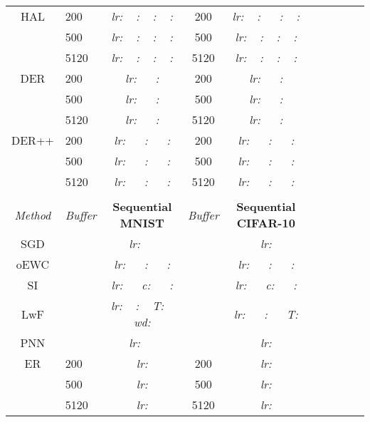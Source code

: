 \documentclass{article}
\newcommand{\xmark}{\textbf{\textendash}}
\begin{document}
\begin{table}[H]
\begin{tabular}{| Sl | Sc | Sl | Sc | Sl |}
HAL     & 200    & \textit{lr:}   ~ \textit{:}  ~ \textit{:}  ~ \textit{:}   & 200  & \textit{lr:}   ~ \textit{:} ~~ \textit{:}  ~ \textit{:}   \\
        & 500    & \textit{lr:}   ~ \textit{:}  ~ \textit{:}  ~ \textit{:}    & 500  & \textit{lr:}   ~ \textit{:}  ~ \textit{:}  ~ \textit{:}   \\
        & 5120   & \textit{lr:}   ~ \textit{:}  ~ \textit{:}  ~ \textit{:}    & 5120 & \textit{lr:}   ~ \textit{:}  ~ \textit{:}  ~ \textit{:}   \\
DER     & 200    & \textit{lr:}   ~~ \textit{:}  & 200  & \textit{lr:}   ~~ \textit{:}  \\
        & 500    & \textit{lr:}   ~~ \textit{:}  & 500  & \textit{lr:}   ~~ \textit{:}  \\
        & 5120   & \textit{lr:}   ~~ \textit{:}  & 5120 & \textit{lr:}   ~~ \textit{:}  \\
DER++   & 200    & \textit{lr:}   ~~ \textit{:}  ~~ \textit{:}  & 200  & \textit{lr:}   ~~ \textit{:}  ~~ \textit{:}  \\
        & 500    & \textit{lr:}   ~~ \textit{:}  ~~ \textit{:}  & 500  & \textit{lr:}   ~~ \textit{:}  ~~ \textit{:}  \\
        & 5120   & \textit{lr:}   ~~ \textit{:}  ~~ \textit{:}  & 5120 & \textit{lr:}   ~~ \textit{:}  ~~ \textit{:}  \\
        & & & & \\
\hline
\textit{Method} & \textit{Buffer} & \textbf{Sequential MNIST} & \textit{Buffer} & \textbf{Sequential CIFAR-10}  \\
\hline
SGD & \xmark & \textit{lr:}   ~~ & \xmark & \textit{lr:}  \\
oEWC    & \xmark & \textit{lr:}  ~~ \textit{:}  ~~ \textit{:}  & \xmark & \textit{lr:}  ~~ \textit{:}  ~~ \textit{:}  \\
SI      & \xmark & \textit{lr:}  ~~ \textit{c:}  ~~ \textit{:}  & \xmark & \textit{lr:}  ~~ \textit{c:}  ~~ \textit{:}  \\
LwF     & \xmark & \textit{lr:}  ~ \textit{: } ~ \textit{T:}  ~ \textit{wd:}  & \xmark & \textit{lr:}  ~~ \textit{: } ~~ \textit{T:}  \\
PNN     & \xmark & \textit{lr:}   ~~ & \xmark & \textit{lr:}  \\
ER      & 200    & \textit{lr:}    & 200  &\textit{lr:}   \\
        & 500    & \textit{lr:}     & 500  &\textit{lr:}   \\
        & 5120   & \textit{lr:}    & 5120 &\textit{lr:}   \\

\end{tabular}
\end{table}
\end{document}
